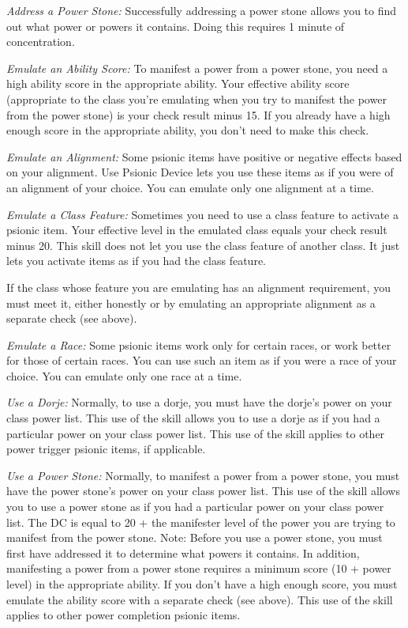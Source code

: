 \textit{Address a Power Stone:} Successfully addressing a power stone allows you to find out what power or powers it contains. Doing this requires 1 minute of concentration.

\textit{Emulate an Ability Score:} To manifest a power from a power stone, you need a high ability score in the appropriate ability. Your effective ability score (appropriate to the class you’re emulating when you try to manifest the power from the power stone) is your check result minus 15. If you already have a high enough score in the appropriate ability, you don’t need to make this check.

\textit{Emulate an Alignment:} Some psionic items have positive or negative effects based on your alignment. Use Psionic Device lets you use these items as if you were of an alignment of your choice. You can emulate only one alignment at a time.

\textit{Emulate a Class Feature:} Sometimes you need to use a class feature to activate a psionic item. Your effective level in the emulated class equals your check result minus 20. This skill does not let you use the class feature of another class. It just lets you activate items as if you had the class feature.

If the class whose feature you are emulating has an alignment requirement, you must meet it, either honestly or by emulating an appropriate alignment as a separate check (see above).

\textit{Emulate a Race:} Some psionic items work only for certain races, or work better for those of certain races. You can use such an item as if you were a race of your choice. You can emulate only one race at a time.

\textit{Use a Dorje:} Normally, to use a dorje, you must have the dorje’s power on your class power list. This use of the skill allows you to use a dorje as if you had a particular power on your class power list. This use of the skill applies to other power trigger psionic items, if applicable.

\textit{Use a Power Stone:} Normally, to manifest a power from a power stone, you must have the power stone’s power on your class power list. This use of the skill allows you to use a power stone as if you had a particular power on your class power list. The DC is equal to 20 + the manifester level of the power you are trying to manifest from the power stone. Note: Before you use a power stone, you must first have addressed it to determine what powers it contains. In addition, manifesting a power from a power stone requires a minimum score (10 + power level) in the appropriate ability. If you don’t have a high enough score, you must emulate the ability score with a separate check (see above). This use of the skill applies to other power completion psionic items.

